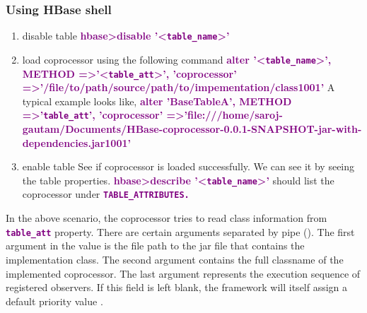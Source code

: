 \documentclass[11pt,a4paper,bibtotoc,idxtotoc,headsepline,footsepline,footexclude,BCOR12mm,DIV13]{scrbook}
\begin{document}
\subsubsection{Using HBase shell}
\begin{enumerate}
	\item disable table \newline
			\space \space \textbf{\textcolor{purple}{ hbase\textgreater disable '\textless \texttt{table\_name}\textgreater'}}
	\item load coprocessor using the following command \newline
	\textbf{\textcolor{purple}{alter '\textless \texttt{table\_name}\textgreater', \newline 
	METHOD =\textgreater '\textless \texttt{table\_att}\textgreater', 'coprocessor' =\textgreater '/file/to/path\text{\textbar}\newline/source/path/to/impementation/class\text{\textbar}1001\text{\textbar}'}}
	\newline \newline
	A typical example looks like,\newline \newline
	\textbf{\textcolor{purple}{alter 'BaseTableA', METHOD =\textgreater '\texttt{table\_att}', 'coprocessor' =\textgreater 'file:///home/saroj-gautam/Documents/HBase-coprocessor-0.0.1-SNAPSHOT-jar-with-dependencies.jar\text{\textbar}\texttt {}\text{\textbar}1001\text{\textbar}'}}
	
	\item enable table \newline
	See if coprocessor is loaded successfully. We can see it by seeing the table properties. \newline 
	\textbf{\textcolor{purple}{hbase\textgreater describe '\textless \texttt{table\_name}\textgreater'}} \space should list the coprocessor under \textbf{\textcolor{purple}{\texttt{TABLE\_ATTRIBUTES.}}} \newline

\end{enumerate}

In the above scenario, the coprocessor tries to read class information from \textbf{\textcolor{purple}{\texttt{table\_att}}} property. There are certain arguments separated by pipe (\text{\textbar}). The first argument in the value is the file path to the jar file that contains the implementation class. The second argument contains the full classname of the implemented coprocessor. The last argument represents the execution sequence of registered observers. If this field is left blank, the framework will itself assign a default priority value \cite{hbase:site}.
\end{document}
